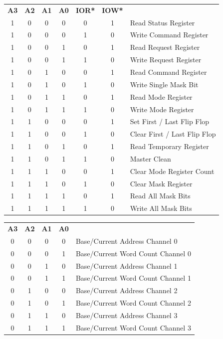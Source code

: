 \documentclass[11pt]{book}
\begin{document}
\begin{center}
\begin{tabular}{ccccccl}
\textbf{A3} & \textbf{A2} & \textbf{A1} & \textbf{A0} & \textbf{IOR*} & \textbf{IOW*} & \\
1 & 0 & 0 & 0 & 0 & 1 & Read Status Register \\
1 & 0 & 0 & 0 & 1 & 0 & Write Command Register \\
1 & 0 & 0 & 1 & 0 & 1 & Read Request Register \\
1 & 0 & 0 & 1 & 1 & 0 & Write Request Register \\
1 & 0 & 1 & 0 & 0 & 1 & Read Command Register \\
1 & 0 & 1 & 0 & 1 & 0 & Write Single Mask Bit \\
1 & 0 & 1 & 1 & 0 & 1 & Read Mode Register \\
1 & 0 & 1 & 1 & 1 & 0 & Write Mode Register \\
1 & 1 & 0 & 0 & 0 & 1 & Set First / Last Flip Flop \\
1 & 1 & 0 & 0 & 1 & 0 & Clear First / Last Flip Flop \\
1 & 1 & 0 & 1 & 0 & 1 & Read Temporary Register \\
1 & 1 & 0 & 1 & 1 & 0 & Master Clean \\
1 & 1 & 1 & 0 & 0 & 1 & Clear Mode Register Count \\
1 & 1 & 1 & 0 & 1 & 0 & Clear Mask Register \\
1 & 1 & 1 & 1 & 0 & 1 & Read All Mask Bits \\
1 & 1 & 1 & 1 & 1 & 0 & Write All Mask Bits \\
\end{tabular}
\end{center}

\begin{center}
\begin{tabular}{ccccl}
\textbf{A3} & \textbf{A2} & \textbf{A1} & \textbf{A0} & \\
0 & 0 & 0 & 0 & Base/Current Address Channel 0 \\
0 & 0 & 0 & 1 & Base/Current Word Count Channel 0 \\
0 & 0 & 1 & 0 & Base/Current Address Channel 1 \\
0 & 0 & 1 & 1 & Base/Current Word Count Channel 1 \\
0 & 1 & 0 & 0 & Base/Current Address Channel 2 \\
0 & 1 & 0 & 1 & Base/Current Word Count Channel 2 \\
0 & 1 & 1 & 0 & Base/Current Address Channel 3 \\
0 & 1 & 1 & 1 & Base/Current Word Count Channel 3 \\
\end{tabular}
\end{center}
\end{document}
